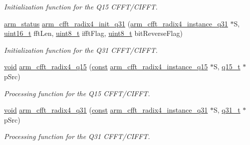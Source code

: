 \begin{DoxyCompactItemize}
\begin{DoxyCompactList}\small\item\em Initialization function for the Q15 C\-F\-F\-T/\-C\-I\-F\-F\-T. \end{DoxyCompactList}\item 
\hyperlink{arm__math_8h_a5e459c6409dfcd2927bb8a57491d7cf6}{arm\-\_\-status} \hyperlink{group___radix4___c_f_f_t___c_i_f_f_t_gad5caaafeec900c8ff72321c01bbd462c}{arm\-\_\-cfft\-\_\-radix4\-\_\-init\-\_\-q31} (\hyperlink{structarm__cfft__radix4__instance__q31}{arm\-\_\-cfft\-\_\-radix4\-\_\-instance\-\_\-q31} $\ast$S, \hyperlink{stdint_8h_a273cf69d639a59973b6019625df33e30}{uint16\-\_\-t} fft\-Len, \hyperlink{stdint_8h_aba7bc1797add20fe3efdf37ced1182c5}{uint8\-\_\-t} ifft\-Flag, \hyperlink{stdint_8h_aba7bc1797add20fe3efdf37ced1182c5}{uint8\-\_\-t} bit\-Reverse\-Flag)
\begin{DoxyCompactList}\small\item\em Initialization function for the Q31 C\-F\-F\-T/\-C\-I\-F\-F\-T. \end{DoxyCompactList}\item 
\hyperlink{group___n_a_m_e_ga18028b8badbf1ea7e704ccac3c488e82}{void} \hyperlink{group___radix4___c_f_f_t___c_i_f_f_t_ga8d66cdac41b8bf6cefdb895456eee84a}{arm\-\_\-cfft\-\_\-radix4\-\_\-q15} (\hyperlink{group___n_a_m_e_ga7ae6d0e43244213b34de2c2b9aa30da6}{const} \hyperlink{structarm__cfft__radix4__instance__q15}{arm\-\_\-cfft\-\_\-radix4\-\_\-instance\-\_\-q15} $\ast$S, \hyperlink{arm__math_8h_ab5a8fb21a5b3b983d5f54f31614052ea}{q15\-\_\-t} $\ast$p\-Src)
\begin{DoxyCompactList}\small\item\em Processing function for the Q15 C\-F\-F\-T/\-C\-I\-F\-F\-T. \end{DoxyCompactList}\item 
\hyperlink{group___n_a_m_e_ga18028b8badbf1ea7e704ccac3c488e82}{void} \hyperlink{group___radix4___c_f_f_t___c_i_f_f_t_gafde3ee1f58cf393b45a9073174fff548}{arm\-\_\-cfft\-\_\-radix4\-\_\-q31} (\hyperlink{group___n_a_m_e_ga7ae6d0e43244213b34de2c2b9aa30da6}{const} \hyperlink{structarm__cfft__radix4__instance__q31}{arm\-\_\-cfft\-\_\-radix4\-\_\-instance\-\_\-q31} $\ast$S, \hyperlink{arm__math_8h_adc89a3547f5324b7b3b95adec3806bc0}{q31\-\_\-t} $\ast$p\-Src)
\begin{DoxyCompactList}\small\item\em Processing function for the Q31 C\-F\-F\-T/\-C\-I\-F\-F\-T. \end{DoxyCompactList}\end{DoxyCompactItemize}


